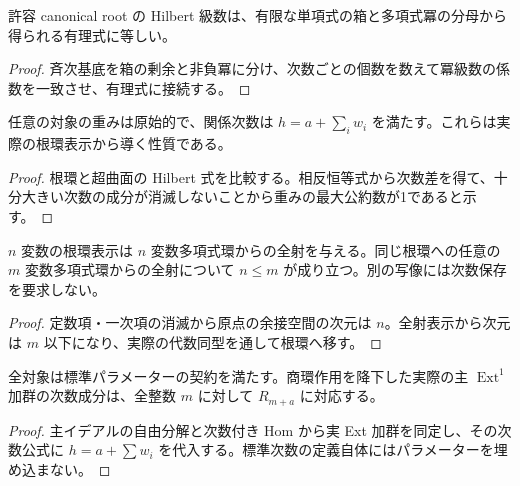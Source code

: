 \begin{theorem}
\label{thm:hilbert}
\leanok
許容 canonical root の Hilbert 級数は、有限な単項式の箱と多項式冪の分母から得られる有理式に等しい。
\end{theorem}
\begin{proof}
\leanok
{}
斉次基底を箱の剰余と非負冪に分け、次数ごとの個数を数えて冪級数の係数を一致させ、有理式に接続する。
\end{proof}

\begin{theorem}[内在的な数値恒等式]
\label{thm:numerics}
\leanok
任意の対象の重みは原始的で、関係次数は $h=a+\sum_iw_i$ を満たす。これらは実際の根環表示から導く性質である。
\end{theorem}
\begin{proof}
\leanok
{}
根環と超曲面の Hilbert 式を比較する。相反恒等式から次数差を得て、十分大きい次数の成分が消滅しないことから重みの最大公約数が1であると示す。
\end{proof}

\begin{theorem}[最小生成元数の一致]
\label{thm:minimum}
\leanok
$n$ 変数の根環表示は $n$ 変数多項式環からの全射を与える。同じ根環への任意の $m$ 変数多項式環からの全射について $n\leq m$ が成り立つ。別の写像には次数保存を要求しない。
\end{theorem}
\begin{proof}
\leanok
{}
定数項・一次項の消滅から原点の余接空間の次元は $n$。全射表示から次元は $m$ 以下になり、実際の代数同型を通して根環へ移す。
\end{proof}

\begin{theorem}[標準加群の次数シフト]
\label{thm:canonical}
\leanok
全対象は標準パラメーターの契約を満たす。商環作用を降下した実際の主 $\operatorname{Ext}^1$ 加群の次数成分は、全整数 $m$ に対して $R_{m+a}$ に対応する。
\end{theorem}
\begin{proof}
\leanok
{}
主イデアルの自由分解と次数付き Hom から実 Ext 加群を同定し、その次数公式に $h=a+\sum w_i$ を代入する。標準次数の定義自体にはパラメーターを埋め込まない。
\end{proof}

